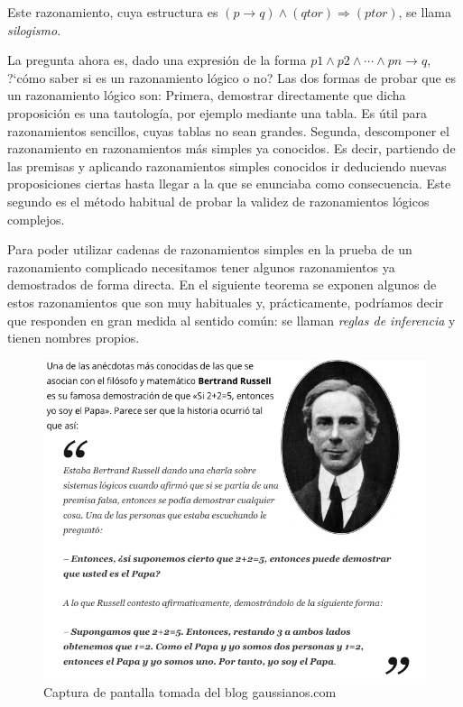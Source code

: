Este razonamiento, cuya estructura es $(p \to  q) \wedge (q to r) \Rightarrow (p to r)$, se llama \emph{silogismo}.



La pregunta ahora es, dado una expresión de la forma $ p1 \wedge p2 \wedge \cdots \wedge pn \to  q$, ?`cómo saber si es un razonamiento lógico o no? Las dos formas de probar que es un razonamiento lógico son: Primera, demostrar directamente que dicha proposición es una tautología, por ejemplo mediante una tabla. Es útil para razonamientos sencillos, cuyas tablas no sean grandes. Segunda, descomponer el razonamiento en razonamientos más simples ya conocidos. Es decir, partiendo de las premisas y aplicando razonamientos simples conocidos ir deduciendo nuevas proposiciones ciertas hasta llegar a la que se enunciaba como consecuencia. Este segundo es el método habitual de probar la validez de razonamientos lógicos complejos.

Para poder utilizar cadenas de razonamientos simples en la prueba de un razonamiento complicado necesitamos tener algunos razonamientos ya demostrados de forma directa. En el siguiente teorema se exponen algunos de estos razonamientos que son muy habituales y, prácticamente, podríamos decir que responden en gran medida al sentido común: se llaman \emph{reglas de inferencia} y tienen nombres propios.

 	\begin{figure}[H] 
		\centering
		\includegraphics[width=.85\textwidth]{imagenes/apendices/APENDICESIM37.png}
		\caption{Captura de pantalla tomada del blog gaussianos.com}
	\end{figure}

